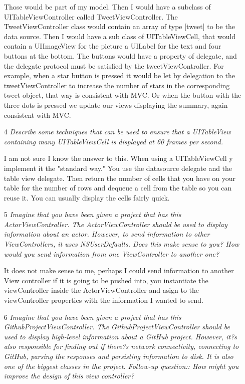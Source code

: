 \documentclass[12]{report}
\begin{document}
\begin{itemize}
Those would be part of my model. Then I would have a subclass of UITableViewController called TweetViewController.  The TweetViewController class would contain an array of type [tweet] to be the data source. Then I would have a sub class of UITableViewCell, that would contain a UIImageView for the picture a UILabel for the text and four buttons at the bottom. The buttons would have a property of delegate, and the delegate protocol must be satisfied by the tweetViewController.  For example, when a star button is pressed it would be let by delegation to the tweetViewController to increase the number of stars in the corresponding tweet object, that way is consistent with MVC.  Or when the button with the three dots is pressed we update our views displaying the summary, again consistent with MVC. 


\item[4] {\it Describe some techniques that can be used to ensure that a UITableView containing many UITableViewCell is displayed at 60 frames per second.}

I am not sure I know the answer to this. When using a UITableViewCell y implement it the "standard way." You use the datasource delegate and the table view delegate. Then return the number of cells that you have on your table for the number of rows and dequeue a cell from the table so you can reuse it. You can usually display the cells fairly quick. 

\item[5] {\it Imagine that you have been given a project that has this ActorViewController. The ActorViewController should be used to display information about an actor. However, to send information to other ViewControllers, it uses NSUserDefaults. Does this make sense to you? How would you send information from one ViewController to another one?}

It does not make sense to me, perhaps I could send information to another View controller if it is going to be pushed into, you instantiate the viewController inside the ActorViewController and asign to the viewController properties with the information I wanted to send. 

\item[6] {\it Imagine that you have been given a project that has this GithubProjectViewController. The GithubProjectViewController should be used to display high-level information about a GitHub project. However, it?s also responsible for finding out if there?s network connectivity, connecting to GitHub, parsing the responses and persisting information to disk. It is also one of the biggest classes in the project. Follow-up question:: How might you improve the design of this view controller?}


\end{itemize}
\end{document}
